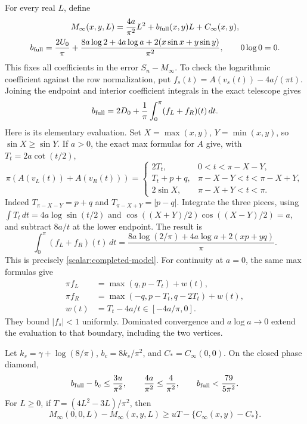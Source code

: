 For every real $L$, define
\begin{equation}\label{scalar:completed-model}
 \begin{gathered}
 M_\infty(x,y,L)=\frac{4a}{\pi^2}L^2+b_{\rm full}(x,y)L
                         +C_\infty(x,y),\\
 b_{\rm full}=\frac{2U_0}{\pi}
  +\frac{8a\log2+4a\log a+2(x\sin x+y\sin y)}{\pi^2},
 \qquad 0\log0=0.
 \end{gathered}
\end{equation}
This fixes all coefficients in the error $S_n-M_\infty$.
To check the logarithmic coefficient against the row normalization,
put $f_s(t)=A(v_s(t))-4a/(\pi t)$.  Joining the endpoint and
interior coefficient integrals in the exact telescope gives
\[
 b_{\rm full}=2D_0+\frac1\pi\int_0^\pi(f_L+f_R)(t)\,dt.
\]
Here is its elementary evaluation.  Set $X=\max(x,y)$,
$Y=\min(x,y)$, so $\sin X\geq\sin Y$.  If $a>0$, the exact max
formulas for $A$ give, with $T_t=2a\cot(t/2)$,
\[
 \pi(A(v_L(t))+A(v_R(t)))=
 \begin{cases}
 2T_t,&0<t<\pi-X-Y,\\
 T_t+p+q,&\pi-X-Y<t<\pi-X+Y,\\
 2\sin X,&\pi-X+Y<t<\pi.
 \end{cases}
\]
Indeed $T_{\pi-X-Y}=p+q$ and
$T_{\pi-X+Y}=|p-q|$.  Integrate the three pieces, using
$\int T_t\,dt=4a\log\sin(t/2)$ and
$\cos((X+Y)/2)\cos((X-Y)/2)=a$, and subtract $8a/t$ at the
lower endpoint.  The result is
\[
 \int_0^\pi(f_L+f_R)(t)\,dt
 =\frac{8a\log(2/\pi)+4a\log a+2(xp+yq)}\pi.
\]
This is precisely \eqref{scalar:completed-model}.  For continuity at
$a=0$, the same max formulas give
\begin{align*}
 \pi f_L&=\max(q,p-T_t)+w(t),\\
 \pi f_R&=\max(-q,p-T_t,q-2T_t)+w(t),\\
 w(t)&=T_t-4a/t\in[-4a/\pi,0].
\end{align*}
They bound $|f_s|<1$ uniformly.  Dominated convergence and
$a\log a\to0$ extend the evaluation to that boundary, including the
two vertices.

\begin{lemma}
\label{scalar:coefficient-loss}
Let $k_s=\gamma+\log(8/\pi)$, $b_c=8k_s/\pi^2$, and
$C_*=C_\infty(0,0)$.
On the closed phase diamond,
\begin{equation}\label{scalar:b-loss}
 b_{\rm full}-b_c\leq\frac{3u}{\pi^2},\qquad
 \frac{4a}{\pi^2}\leq\frac4{\pi^2},\qquad
 b_{\rm full}<\frac{79}{5\pi^2}.
\end{equation}
For $L\geq0$, if $T=(4L^2-3L)/\pi^2$, then
\begin{equation}\label{scalar:model-loss}
 M_\infty(0,0,L)-M_\infty(x,y,L)
 \geq uT-\{C_\infty(x,y)-C_*\}.
\end{equation}
\end{lemma}

